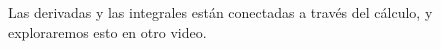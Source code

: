 \documentclass[preview]{standalone}
\begin{document}
\begin{center}
Las derivadas y las integrales están conectadas a través del cálculo, y exploraremos esto en otro video.
\end{center}
\end{document}
